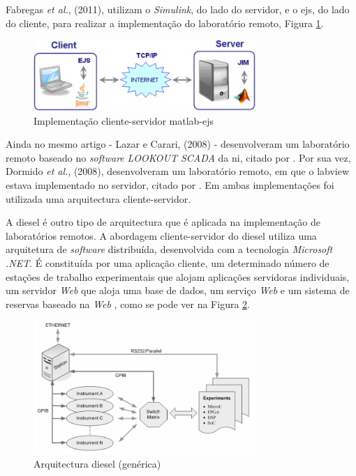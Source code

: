 Fabregas \textit{et al.}, (2011), utilizam o \textit{Simulink}, do lado do servidor, e o \acrfull{ejs}, do lado do cliente, para realizar a implementação do \acrshort{laboratório remoto}\cite{FABREGAS20111686}, Figura \ref{fig:ejs}.
\begin{figure}[hbtp]
    \centering
    \includegraphics[width=0.75\textwidth]{figures/sej.jpg}
    \caption{Implementação cliente-servidor \acrshort{matlab}-\acrshort{ejs}}
    \label{fig:ejs}
\end{figure}
Ainda no mesmo artigo - Lazar e Carari, (2008) - desenvolveram um \acrshort{laboratório remoto} baseado no \textit{software} \textit{LOOKOUT SCADA} da \acrfull{ni}, \cite{lazar} citado por \cite{FABREGAS20111686}.
Por sua vez, Dormido \textit{et al.}, (2008), desenvolveram um \acrshort{laboratório remoto}, em que o \acrfull{labview} estava implementado no servidor, \cite{dormido} citado por \cite{FABREGAS20111686}. Em ambas implementações foi utilizada uma arquitectura cliente-servidor.

A \acrfull{diesel} é outro tipo de arquitectura que é aplicada na implementação de laboratórios remotos. A abordagem cliente-servidor do \acrshort{diesel} utiliza uma arquitetura de \textit{software} distribuída, desenvolvida com a tecnologia \textit{Microsoft .NET}. É constituída por uma aplicação cliente, um determinado número de estações de trabalho experimentais que alojam aplicações servidoras individuais, um servidor \textit{Web} que aloja uma base de dados, um serviço \textit{Web} e um sistema de reservas baseado na \textit{Web} \cite{diesel}, como se pode ver na Figura \ref{fig:resumoarquitectura}.
\begin{figure}[hbtp]
    \centering
    \includegraphics[width=0.75\textwidth]{figures/diesel.png}
    \caption{Arquitectura \acrshort{diesel} (genérica)\cite{diesel}}
    \label{fig:resumoarquitectura}
\end{figure}

